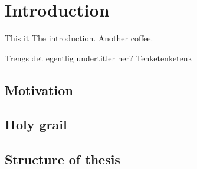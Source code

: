 \chapter{Introduction}

This it The introduction.
Another coffee.

Trengs det egentlig undertitler her? Tenketenketenk
\newpage
\section{Motivation}
\section{Holy grail}
\section{Structure of thesis}

